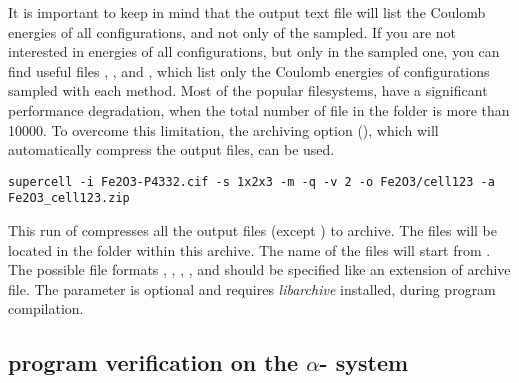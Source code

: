 \documentclass[a4paper,10pt]{article}
\begin{document}
It is important to keep in mind that the output text file  will list the Coulomb energies of all configurations, and not only of the sampled. If you are not interested in energies of all configurations, but only in the sampled one, you can find useful files , , and , which list only the Coulomb energies of configurations sampled with each method. Most of the popular filesystems, have a significant performance degradation, when the total number of file in the folder is more than \num{10000}. To overcome this limitation, the archiving option (), which will automatically compress the output files, can be used.
\begin{Verbatim}[breaklines]
  supercell -i Fe2O3-P4332.cif -s 1x2x3 -m -q -v 2 -o Fe2O3/cell123 -a Fe2O3_cell123.zip
\end{Verbatim}
This run of \sups{} compresses all the output files (except ) to  archive. The files will be located in the folder  within this archive. The name of the files will start from . The possible file formats , , , ,  and  should be specified like an extension of archive file. The parameter is optional and requires \textit{libarchive} installed, during program compilation.


\subsection*{\Sups{} program verification on the $\alpha$- system}
\end{document}
